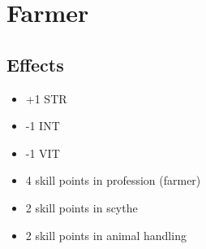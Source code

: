 \section{Farmer}\label{background:farmer}

\subsection{Effects}
\begin{itemize}
    \item +1 STR
    \item -1 INT
    \item -1 VIT
    \item 4 skill points in profession (farmer)
    \item 2 skill points in scythe
    \item 2 skill points in animal handling
\end{itemize}
